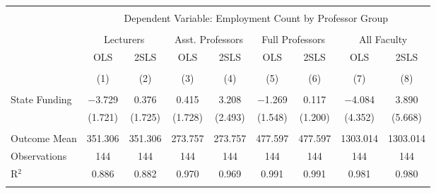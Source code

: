 
\begin{tabular}{@{\extracolsep{5pt}}lcccccccc} 
\\[-1.8ex]\hline 
\hline \\[-1.8ex] 
 & \multicolumn{8}{c}{Dependent Variable: Employment Count by Professor Group} \\ 
\cline{2-9} 
\\[-1.8ex] & \multicolumn{2}{c}{Lecturers} & \multicolumn{2}{c}{Asst. Professors} & \multicolumn{2}{c}{Full Professors} & \multicolumn{2}{c}{All Faculty} \\ 
 & OLS & 2SLS & OLS & 2SLS & OLS & 2SLS & OLS & 2SLS \\ 
\\[-1.8ex] & (1) & (2) & (3) & (4) & (5) & (6) & (7) & (8)\\ 
\hline \\[-1.8ex] 
 State Funding & $-$3.729 & 0.376 & 0.415 & 3.208 & $-$1.269 & 0.117 & $-$4.084 & 3.890 \\ 
  & (1.721) & (1.725) & (1.728) & (2.493) & (1.548) & (1.200) & (4.352) & (5.668) \\ 
 \hline \\[-1.8ex] 
Outcome Mean & 351.306 & 351.306 & 273.757 & 273.757 & 477.597 & 477.597 & 1303.014 & 1303.014 \\ 
Observations & 144 & 144 & 144 & 144 & 144 & 144 & 144 & 144 \\ 
R$^{2}$ & 0.886 & 0.882 & 0.970 & 0.969 & 0.991 & 0.991 & 0.981 & 0.980 \\ 
\hline 
\hline \\[-1.8ex] 
\end{tabular} 
